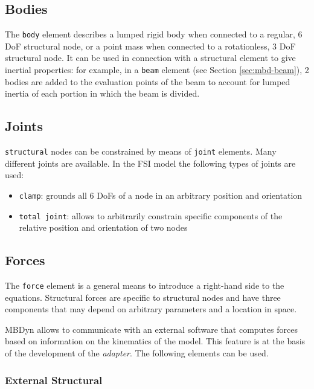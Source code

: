 \subsection{Bodies}
\label{sec:mbd-body}

The \texttt{body} element describes a lumped rigid body when connected to a regular, 6 DoF structural node, or a point mass when connected to a rotationless, 3 DoF structural node. It can be used in connection with a structural element to give inertial properties: for example, in a \texttt{beam} element (see Section \ref{sec:mbd-beam}), 2 bodies are added to the evaluation points of the beam to account for lumped inertia of each portion in which the beam is divided. 


\subsection{Joints}
\label{sec:mbd-joint}

\texttt{structural} nodes can be constrained by means of \texttt{joint} elements. Many different joints are available. In the FSI model the following types of joints are used:

\begin{itemize}
	\item \texttt{clamp}: grounds all 6 DoFs of a node in an arbitrary position and orientation
	\item \texttt{total joint}: allows to arbitrarily constrain specific components of the relative position and orientation of two nodes\cite{masarati2013formulation}
\end{itemize}


\subsection{Forces}
\label{sec:mbd-forces}

The \texttt{force} element is a general means to introduce a right-hand side to the equations. Structural forces are specific to structural
nodes and  have three components that may depend on arbitrary parameters and a location in space.

MBDyn allows to communicate with an external software that computes forces based on information on the kinematics of the model. This feature is at the basis of the development of the \textit{adapter}. The following elements can be used.


\subsubsection{External Structural}

